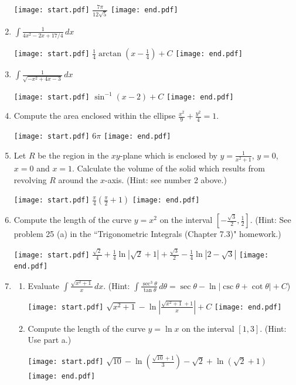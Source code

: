 \documentclass[12pt]{article}
\begin{document}
\begin{enumerate}
\texttt{[image: start.pdf]}
{{$\frac{7\pi}{12\sqrt{5}}$}}
\texttt{[image: end.pdf]}


\item $\int \frac{1}{4x^2-2x+17/4}\,dx$ 

\texttt{[image: start.pdf]}
{{$\frac{1}{4}\arctan{\left(x-\frac{1}{4}\right)}+C$}}
\texttt{[image: end.pdf]}


\item $\int \frac{1}{\sqrt{-x^2+4x-3}} \,dx$

\texttt{[image: start.pdf]}
{{$\sin^{-1}(x-2)+C$}}
\texttt{[image: end.pdf]}


\item Compute the area enclosed within the ellipse $\frac{x^2}{9}+\frac{y^2}{4}=1$.

\texttt{[image: start.pdf]}
{{$6\pi$}}
\texttt{[image: end.pdf]}


\item Let $R$ be the region in the $xy$-plane which is enclosed by $y=\frac{1}{x^2+1}$, $y=0$, $x=0$ and $x=1$.  Calculate the volume of the solid which results from revolving $R$ around the $x$-axis.  (Hint: see number 2 above.)

\texttt{[image: start.pdf]}
{{$\frac{\pi}{4}\left(\frac{\pi}{2}+1\right)$}}
\texttt{[image: end.pdf]}


\item Compute the length of the curve $y=x^2$ on the interval $\left[-\frac{\sqrt{3}}{2},\frac{1}{2}\right]$.  (Hint: See problem 25 (a) in the ``Trigonometric Integrals (Chapter 7.3)" homework.)

\texttt{[image: start.pdf]}
{{$\frac{\sqrt{2}}{4}+\frac{1}{4}\ln{\left|\sqrt{2}+1\right|}+\frac{\sqrt{3}}{2}-\frac{1}{4}\ln{\left|2-\sqrt{3}\right|}$}}
\texttt{[image: end.pdf]}


\item \begin{enumerate}

\item Evaluate $\int \frac{\sqrt{x^2+1}}{x} \,dx$.  (Hint: $\int \frac{\sec^3{\theta}}{\tan{\theta}} \,d\theta = \sec{\theta}-\ln{|\csc{\theta}+\cot{\theta}|}+C$)

\texttt{[image: start.pdf]}
{{$\sqrt{x^2+1}-\ln{\left|\frac{\sqrt{x^2+1}+1}{x}\right|}+C$}}
\texttt{[image: end.pdf]}


\item Compute the length of the curve $y=\ln{x}$ on the interval $[1,3]$.  (Hint: Use part a.)

\texttt{[image: start.pdf]}
{{$\sqrt{10}-\ln{\left(\frac{\sqrt{10}+1}{3}\right)}-\sqrt{2}+\ln{\left(\sqrt{2}+1\right)}$}}
\texttt{[image: end.pdf]}



\end{enumerate}
\end{enumerate}
\end{document}
